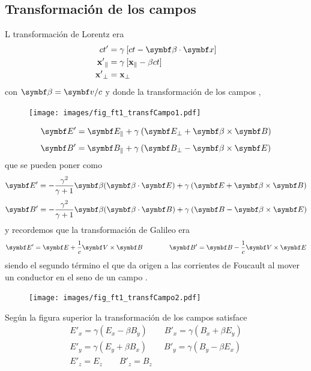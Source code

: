 \documentclass[10pt,oneside]{CBFT_book}
\begin{document}
\subsection{Transformación de los campos}

L transformación de Lorentz era 
\begin{align*}
	ct' &= \gamma \: [ ct - \pe{\beta}{x} ] \\
	\mathbf{x'}_\parallel &= \gamma \: [ \mathbf{x}_\parallel - {\beta}ct ] \\
	\mathbf{x'}_\perp &= \mathbf{x}_\perp
\end{align*}
con $\vb{\beta} = \vb{v}/c$ y donde la transformación de los campos , 

\begin{figure}[htb]
	\begin{center}
	\texttt{[image: images/fig\_ft1\_transfCampo1.pdf]}	 
	\end{center}
	\caption{}
\end{figure} 

\[
	\vb{E}' = \vb{E}_\parallel + \gamma \: ( \vb{E}_\perp  + \pv{\beta}{B} )
\]
\[
	\vb{B}' = \vb{B}_\parallel + \gamma \: ( \vb{B}_\perp  - \pv{\beta}{E} )
\]
que se pueden poner como 
\[
	\vb{E}' = - \frac{ \gamma^2 }{ \gamma + 1 }\vb{\beta} (\pe{\beta}{E}) +
		\gamma \: ( \vb{E}  + \pv{\beta}{B} )
\]
\[
	\vb{B}' = - \frac{ \gamma^2 }{ \gamma + 1 }\vb{\beta} (\pe{\beta}{B}) + 
		\gamma \: ( \vb{B}  - \pv{\beta}{E} )
\]
y recordemos que la transformación de Galileo era
\[
	\vb{E}' = \vb{E} + \frac{1}{c} \pv{V}{B} \qquad \qquad 
	\vb{B}' = \vb{B} - \frac{1}{c} \pv{V}{E}
\]
siendo el segundo término el que da origen a las corrientes de Foucault al mover un conductor en el seno
de un campo .

\begin{figure}[htb]
	\begin{center}
	\texttt{[image: images/fig\_ft1\_transfCampo2.pdf]}	 
	\end{center}
	\caption{}
\end{figure} 

Según la figura superior la transformación de los campos satisface 
\begin{align*}
	E'_x = \gamma ( E_x - \beta B_y ) \qquad B'_x = \gamma ( B_x + \beta E_y ) \\
	E'_y = \gamma ( E_y + \beta B_x ) \qquad B'_y = \gamma ( B_y - \beta E_x ) \\
	E'_z = E_z \qquad B'_z = B_z 
\end{align*}
\end{document}
